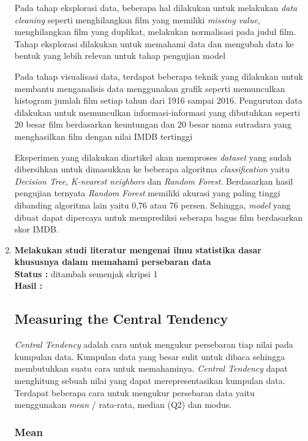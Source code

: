 \documentclass[a4paper,twoside]{article}
\begin{document}
\begin{enumerate}
Pada tahap eksplorasi data, beberapa hal dilakukan untuk melakukan \textit{data cleaning} seperti menghilangkan film yang memiliki \textit{missing value}, menghilangkan film yang duplikat, melakukan normalisasi pada judul film. Tahap  eksplorasi dilakukan untuk memahami data dan mengubah data ke bentuk yang lebih relevan untuk tahap pengujian model

Pada tahap visualisasi data, terdapat beberapa teknik yang dilakukan untuk membantu menganalisis data menggunakan grafik seperti memunculkan histogram jumlah film setiap tahun dari 1916 sampai 2016. Pengurutan data dilakukan untuk memunculkan informasi-informasi yang dibutuhkan seperti 20 besar film 
berdasarkan keuntungan dan 20 besar nama sutradara yang menghasilkan film dengan nilai IMDB tertinggi

Eksperimen yang dilakukan diartikel akan memproses \textit{dataset} yang sudah dibersihkan untuk dimasukkan ke beberapa algoritma \textit{classification} yaitu \textit{Decision Tree}, \textit{K-nearest neighbors} dan \textit{Random Forest}. Berdasarkan hasil pengujian ternyata \textit{Random Forest} memiliki akurasi yang paling tinggi dibanding algoritma lain yaitu 0,76 atau 76 persen. Sehingga, \textit{model} yang dibuat dapat dipercaya untuk memprediksi seberapa bagus film berdasarkan skor IMDB.		
		 
\item \textbf{	 Melakukan studi literatur mengenai ilmu statistika dasar khususnya dalam memahami persebaran data}\\
		{\bf Status :} ditambah semenjak skripsi 1\\
		{\bf Hasil : }
		
\subsection{Measuring the Central Tendency}
\textit{Central Tendency} adalah cara untuk mengukur persebaran tiap nilai pada kumpulan data. Kumpulan data yang besar sulit untuk dibaca sehingga membutuhkan suatu cara untuk memahaminya.  \textit{Central Tendency} dapat menghitung sebuah nilai yang dapat merepresentasikan kumpulan data. Terdapat beberapa cara untuk mengukur persebaran data yaitu menggunakan \textit{mean} / rata-rata, median (Q2) dan modus.  

\subsubsection{Mean}


\end{enumerate}
\end{document}
